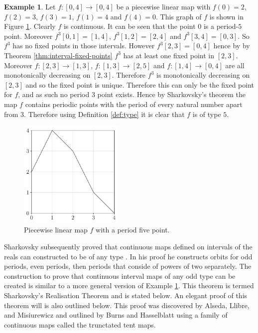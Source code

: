 \documentclass[11pt,a4paper,oneside]{memoir}
\theoremstyle{plain}
\theoremstyle{definition}
\newtheorem{exmp}[thm]{Example}
\begin{document}
\begin{exmp} \label{exmp:piecewise_sharkovsky}
    Let $f: [0, 4] \to [0, 4]$ be a piecewise linear map with $f(0) = 2$, $f(2) = 3$, $f(3) = 1$, $f(1) = 4$ and $f(4) = 0$. This graph of $f$ is shown in Figure \ref{fig:piecewise_linear}. Clearly $f$ is continuous. It can be seen that the point 0 is a period-$5$ point. Moreover $f^3[0, 1] = [1, 4]$, $f^3[1, 2] = [2, 4]$ and $f^3[3, 4] = [0, 3]$. So $f^3$ has no fixed points in those intervals. However $f^3[2, 3] = [0, 4]$ hence by by Theorem \ref{thm:interval-fixed-points} $f^3$ has at least one fixed point in $[2, 3]$. Moreover $f: [2, 3] \to [1, 3]$, $f: [1, 3] \to [2, 5]$ and $f: [1, 4] \to [0, 4]$ are all monotonically decreasing on $[2, 3]$. Therefore $f^3$ is monotonically decreasing on $[2, 3]$ and so the fixed point is unique. Therefore this can only be the fixed point for $f$, and as such no period 3 point exists. Hence by Sharkovsky's theorem the map $f$ contains periodic points with the period of every natural number apart from 3. Therefore using Definition \ref{def:type} it is clear that $f$ is of type $5$.

    \begin{figure}[h]
        \centering
        \includegraphics[width=5cm]{piecewise_0_4}
        \caption{Piecewise linear map $f$ with a period five point.}
        \label{fig:piecewise_linear}
    \end{figure}

\end{exmp}

Sharkovsky subsequently proved that continuous maps defined on intervals of the reals can constructed to be of any type \cite{sharkovsky} \cite{sharkovsky2}. In his proof he constructs orbits for odd periods, even periods, then periods that conside of powers of two separately. The construction to prove that continuous interval maps of any odd type can be created is similar to a more general version of Example \ref{exmp:piecewise_sharkovsky}. This theorem is termed Sharkovsky's Realisation Theorem and is stated below. An elegant proof of this theorem will is also outlined below. This proof was discovered by Alseda, Llibre, and Misiurewicz \cite[Section 2.2]{alm} and outlined by Burns and Hasselblatt \cite[Section 7]{burns-hasselblatt} using a family of continuous maps called the trunctated tent maps.
\end{document}

